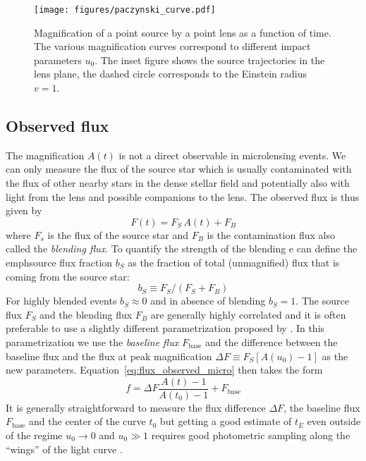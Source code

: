 \documentclass[12pt,dvipsnames]{report}
\begin{document}
\begin{figure}[t]
    \begin{centering}
        \texttt{[image: figures/paczynski\_curve.pdf]}
        \caption{
            Magnification of a point source by a point lens as a function of time. The
            various magnification curves correspond to different impact parameters $u_0$.
            The inset figure
            shows the source trajectories in the lens plane, the dashed circle corresponds
            to the Einstein radius $v=1$.}
        \label{fig:paczynski_curve}
    \end{centering}
\end{figure}

\subsection{Observed flux}
The magnification $A(t)$ is not a direct observable in microlensing events. We
can only measure the flux of the source star which is usually contaminated with
the flux of other nearby stars in the dense stellar field and potentially also
with light from the lens and possible companions to the lens. The observed flux
is thus given by
\begin{equation}
    F(t)=F_S\,A(t)+F_B
    \label{eq:flux_observed_micro}
\end{equation}
where $F_s$ is the flux of the source star and $F_B$ is the contamination flux also
called the \emph{blending flux}. To quantify the strength of the blending e can
define the emph{source flux fraction} $b_S$ as the fraction of total (unmagnified)
flux that is coming from the source star:
\begin{equation}
    b_S\equiv F_S/(F_S + F_B)
\end{equation}
For highly blended events $b_S\approx 0$ and in absence of blending $b_S=1$.
The source flux $F_S$ and the blending flux $F_B$ are generally highly correlated
and it is often preferable to use a slightly different parametrization proposed by
\citet{2009MNRAS.393..816D}. In this parametrization we use the
\emph{baseline flux} $F_\mathrm{base}$ and the difference between
the baseline flux and the flux at peak magnification $\Delta F\equiv F_S[A(u_0)-1]$
as the new parameters.
Equation~\ref{eq:flux_observed_micro} then takes the form
\begin{equation}
    f=\Delta F\frac{A(t) - 1}{A(t_0)-1}+F_\mathrm{base}
    \label{eq:flux_dominik}
\end{equation}
It is generally straightforward to measure the flux difference $\Delta F$, the
baseline flux $F_\mathrm{base}$ and the center of the curve $t_0$ but getting a
good estimate of $t_E$ even outside of the regime $u_0\rightarrow 0$ and
$u_0\gg 1$ requires good photometric sampling along the ``wings'' of the light
curve \citep{2009MNRAS.393..816D}.
\end{document}

